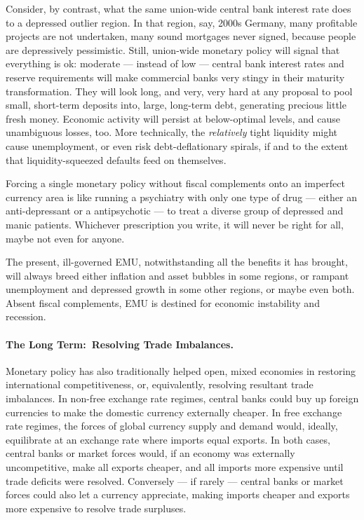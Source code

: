 Consider, by contrast, what the same union-wide central bank interest rate does to a depressed outlier region.
In that region, say, 2000s Germany, many profitable projects are not undertaken, many sound mortgages never signed, because people are depressively pessimistic.
Still, union-wide monetary policy will signal that everything is ok:
moderate --- instead of low --- central bank interest rates and reserve requirements will make commercial banks very stingy in their maturity transformation.
They will look long, and very, very hard at any proposal to pool small, short-term deposits into, large, long-term debt, generating precious little fresh money.
Economic activity will persist at below-optimal levels, and cause unambiguous losses, too.
More technically, the \emph{relatively} tight liquidity might cause unemployment, or even risk debt-deflationary spirals, if and to the extent that liquidity-squeezed defaults feed on themselves.

Forcing a single monetary policy without fiscal complements onto an imperfect currency area is like running a psychiatry with only one type of drug --- either an anti-depressant or a antipsychotic --- to treat a diverse group of depressed and manic patients.
Whichever prescription you write, it will never be right for all, maybe not even for anyone.

The present, ill-governed \gls{EMU}, notwithstanding all the benefits it has brought, will always breed either inflation and asset bubbles in some regions, or rampant unemployment and depressed growth in some other regions, or maybe even both.
Absent fiscal complements, \gls{EMU} is destined for economic instability and recession.

\paragraph[Long Term]{The Long Term:~Resolving Trade Imbalances.} Monetary policy has also traditionally helped open, mixed economies in restoring international competitiveness, or, equivalently, resolving resultant trade imbalances.
In non-free exchange rate regimes, central banks could buy up foreign currencies to make the domestic currency externally cheaper.
In free exchange rate regimes, the forces of global currency supply and demand would, ideally, equilibrate at an exchange rate where imports equal exports.
In both cases, central banks or market forces would, if an economy was externally uncompetitive, make all exports cheaper, and all imports more expensive until trade deficits were resolved.
Conversely --- if rarely --- central banks or market forces could also let a currency appreciate, making imports cheaper and exports more expensive to resolve trade surpluses.

